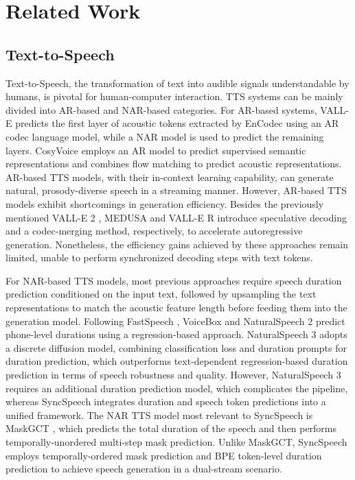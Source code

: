 \section{Related Work}

\subsection{Text-to-Speech}
Text-to-Speech, the transformation of text into audible signals understandable by humans, is pivotal for human-computer interaction. TTS systems can
be mainly divided into AR-based and NAR-based categories. For AR-based systems, VALL-E \cite{valle} predicts the first layer of acoustic tokens extracted by EnCodec \cite{encodec} using an AR codec language model, while a NAR model is used to predict the remaining layers. CosyVoice \cite{cosyvoice} employs an AR model to predict supervised semantic representations and combines flow matching to predict acoustic representations. AR-based TTS models, with their in-context learning capability, can generate natural, prosody-diverse speech in a streaming manner. However, AR-based TTS models exhibit shortcomings in generation efficiency. Besides the previously mentioned VALL-E 2 \cite{valle2}, MEDUSA \cite{MEDUSA} and VALL-E R \cite{Valler} introduce speculative decoding \cite{spdeco} and a codec-merging method, respectively, to accelerate autoregressive generation. Nonetheless, the efficiency gains achieved by these approaches remain limited, unable to perform synchronized decoding steps with text tokens.  


For NAR-based TTS models, most previous approaches require speech duration prediction conditioned on the input text, followed by upsampling the text representations to match the acoustic feature length before feeding them into the generation model. Following FastSpeech \cite{fastspeech2}, VoiceBox \cite{voicebox} and NaturalSpeech 2 \cite{ns2} predict phone-level durations using a regression-based approach. NaturalSpeech 3 \cite{ns3} adopts a discrete diffusion model, combining classification loss and duration prompts for duration prediction, which outperforms text-dependent regression-based duration prediction in terms of speech robustness and quality. However, NaturalSpeech 3 requires an additional duration prediction model, which complicates the pipeline, whereas SyncSpeech integrates duration and speech token predictions into a unified framework. The NAR TTS model most relevant to SyncSpeech is MaskGCT \cite{maskgct}, which predicts the total duration of the speech and then performs temporally-unordered multi-step mask prediction. Unlike MaskGCT, SyncSpeech employs temporally-ordered mask prediction and BPE token-level duration prediction to achieve speech generation in a dual-stream scenario.


